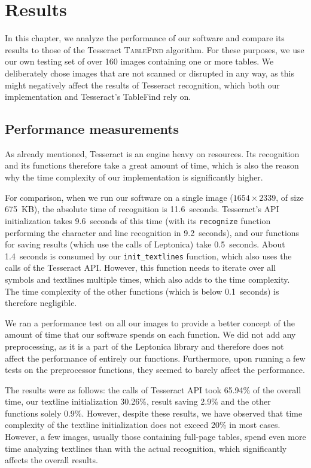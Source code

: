 \chapter{Results}

In this chapter, we analyze the performance of our software and compare its results to those of the Tesseract \textsc{TableFind} algorithm. For these purposes, we use our own testing set of over 160 images containing one or more tables. We deliberately chose images that are not scanned or disrupted in any way, as this might negatively affect the results of Tesseract recognition, which both our implementation and Tesseract's TableFind rely on.

\section{Performance measurements}

As already mentioned, Tesseract is an engine heavy on resources. Its recognition and its functions therefore take a great amount of time, which is also the reason why the time complexity of our implementation is significantly higher.

For comparison, when we run our software on a single image ($1654\times2339$, of size 675~KB), the absolute time of recognition is 11.6~seconds. Tesseract's API initialization takes 9.6~seconds of this time (with its \texttt{recognize} function performing the character and line recognition in 9.2~seconds), and our functions for saving results (which use the calls of Leptonica) take 0.5~seconds. About 1.4~seconds is consumed by our \texttt{init\_textlines} function, which also uses the calls of the Tesseract API. However, this function needs to iterate over all symbols and textlines multiple times, which also adds to the time complexity. The time complexity of the other functions (which is below 0.1~seconds) is therefore negligible.

We ran a performance test on all our images to provide a better concept of the amount of time that our software spends on each function. We did not add any preprocessing, as it is a part of the Leptonica library and therefore does not affect the performance of entirely our functions. Furthermore, upon running a few tests on the preprocessor functions, they seemed to barely affect the performance.

The results were as follows: the calls of Tesseract API took 65.94\% of the overall time, our textline initialization 30.26\%, result saving 2.9\% and the other functions solely 0.9\%. However, despite these results, we have observed that time complexity of the textline initialization does not exceed 20\% in most cases. However, a few images, usually those containing full-page tables, spend even more time analyzing textlines than with the actual recognition, which significantly affects the overall results.

